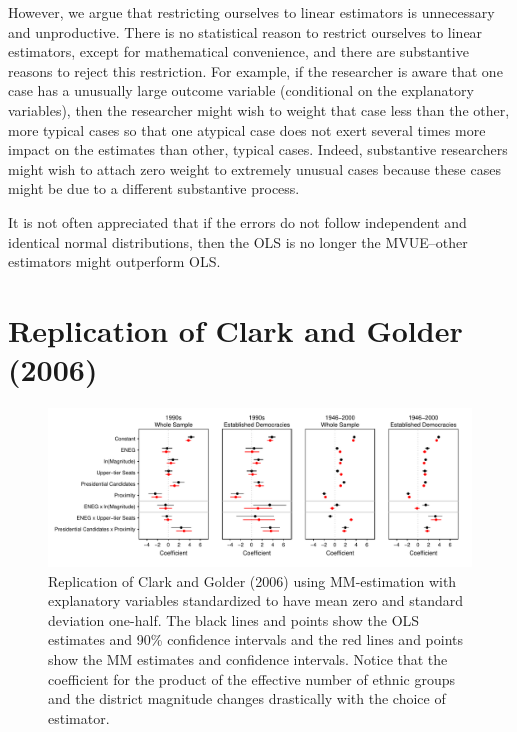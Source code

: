 \documentclass[12pt]{article}
\begin{document}
However, we argue that restricting ourselves to linear estimators is unnecessary and unproductive. There is no statistical reason to restrict ourselves to linear estimators, except for mathematical convenience, and there are substantive reasons to reject this restriction. For example, if the researcher is aware that one case has a unusually large outcome variable (conditional on the explanatory variables), then the researcher might wish to weight that case less than the other, more typical cases so that one atypical case does not exert several times more impact on the estimates than other, typical cases. Indeed, substantive researchers might wish to attach zero weight to extremely unusual cases because these cases might be due to a different substantive process.

It is not often appreciated that if the errors do not follow independent and identical normal distributions, then the OLS is no longer the MVUE--other estimators might outperform OLS. 


\singlespace

%



\section*{Replication of Clark and Golder (2006)}

\begin{figure}[H]
\begin{center}
\includegraphics[scale = .8]{figs/cg-coef-plots.pdf}
\caption{Replication of Clark and Golder (2006) using MM-estimation with explanatory variables standardized to have mean zero and standard deviation one-half. The black lines and points show the OLS estimates and 90\% confidence intervals and the red lines and points show the MM estimates and confidence intervals. Notice that the coefficient for the product of the effective number of ethnic groups and the district magnitude changes drastically with the choice of estimator.}\label{fig:cg-coef-plots}
\end{center}
\end{figure}
\end{document}
